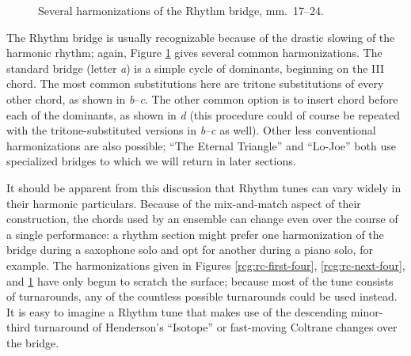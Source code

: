 \begin{figure}[tbp]
  \caption{Several harmonizations of the Rhythm bridge, mm.~17--24.}
  \label{rcg:rc-bridge}
\end{figure}

The Rhythm bridge is usually recognizable because of the drastic slowing of
the harmonic rhythm; again, Figure \ref{rcg:rc-bridge} gives several common
harmonizations. The standard bridge (letter \emph{a}) is a simple cycle of
dominants, beginning on the III chord. The most common substitutions here are
tritone substitutions of every other chord, as shown in \emph{b}--\emph{c}.
The other common option is to insert \ii chord before each of the dominants,
as shown in \emph{d} (this procedure could of course be repeated with the
tritone-substituted versions in \emph{b}--\emph{c} as well). Other less
conventional harmonizations are also possible; ``The Eternal Triangle'' and
``Lo-Joe'' both use specialized bridges to which we will return in later
sections.

It should be apparent from this discussion that Rhythm tunes can vary widely
in their harmonic particulars. Because of the mix-and-match aspect of their
construction, the chords used by an ensemble can change even over the course
of a single performance: a rhythm section might prefer one harmonization of
the bridge during a saxophone solo and opt for another during a piano solo,
for example. The harmonizations given in Figures \ref{rcg:rc-first-four},
\ref{rcg:rc-next-four}, and \ref{rcg:rc-bridge} have only begun to scratch the
surface; because most of the tune consists of turnarounds, any of the
countless possible turnarounds could be used instead. It is easy to imagine a
Rhythm tune that makes use of the descending minor-third turnaround of
Henderson's ``Isotope'' or fast-moving Coltrane changes over the bridge.


